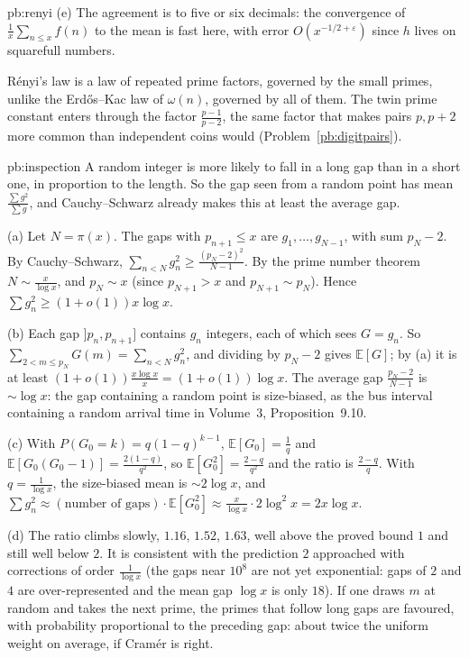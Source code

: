 \begin{solution}{pb:renyi}
(e) The agreement is to five or six decimals: the convergence of $\frac1x\sum_{n\le x}f(n)$ to the mean is fast here, with error $O(x^{-1/2+\varepsilon})$ since $h$ lives on squarefull numbers.

\leads R\'enyi's law is a law of repeated prime factors, governed by the small primes, unlike the Erd\H os--Kac law of $\omega(n)$, governed by all of them. The twin prime constant enters
through the factor $\frac{p-1}{p-2}$, the same factor that makes pairs $p,p+2$ more common than independent coins would (Problem~\ref{pb:digitpairs}).
\end{solution}

\begin{solution}{pb:inspection}
\idea A random integer is more likely to fall in a long gap than in a short one, in proportion to the length. So the gap seen from a random point has mean $\frac{\sum g^2}{\sum g}$,
and Cauchy--Schwarz already makes this at least the average gap.

\writeup (a) Let $N=\pi(x)$. The gaps with $p_{n+1}\le x$ are $g_1,\dots,g_{N-1}$, with sum $p_N-2$. By Cauchy--Schwarz,
$\sum_{n<N}g_n^2\ge\frac{(p_N-2)^2}{N-1}$. By the prime number theorem $N\sim\frac x{\log x}$, and $p_N\sim x$ (since $p_{N+1}>x$ and $p_{N+1}\sim p_N$). Hence $\sum g_n^2\ge(1+o(1))x\log x$.

(b) Each gap $]p_n,p_{n+1}]$ contains $g_n$ integers, each of which sees $G=g_n$. So $\sum_{2<m\le p_N}G(m)=\sum_{n<N}g_n^2$, and dividing by $p_N-2$ gives $\mathbb E[G]$; by (a) it is at least
$(1+o(1))\frac{x\log x}x=(1+o(1))\log x$. The average gap $\frac{p_N-2}{N-1}$ is $\sim\log x$: the gap containing a random point is size-biased, as the bus interval containing a random
arrival time in Volume~3, Proposition~9.10.

(c) With $P(G_0=k)=q(1-q)^{k-1}$, $\mathbb E[G_0]=\frac1q$ and $\mathbb E[G_0(G_0-1)]=\frac{2(1-q)}{q^2}$, so $\mathbb E[G_0^2]=\frac{2-q}{q^2}$ and the ratio is $\frac{2-q}q$. With $q=\frac1{\log x}$,
the size-biased mean is $\sim2\log x$, and $\sum g_n^2\approx(\text{number of gaps})\cdot\mathbb E[G_0^2]\approx\frac x{\log x}\cdot2\log^2x=2x\log x$.

(d) The ratio climbs slowly, $1.16$, $1.52$, $1.63$, well above the proved bound $1$ and still well below $2$. It is consistent with the prediction $2$ approached with corrections of order
$\frac1{\log x}$ (the gaps near $10^8$ are not yet exponential: gaps of $2$ and $4$ are over-represented and the mean gap $\log x$ is only $18$). If one draws $m$ at random and takes the next prime,
the primes that follow long gaps are favoured, with probability proportional to the preceding gap: about twice the uniform weight on average, if Cram\'er is right.


\end{solution}
